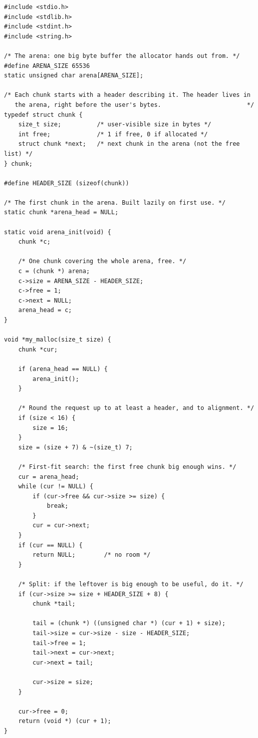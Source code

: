 \begin{lstlisting}[caption={A minimal free-list allocator, on a static arena.}]
#include <stdio.h>
#include <stdlib.h>
#include <stdint.h>
#include <string.h>

/* The arena: one big byte buffer the allocator hands out from. */
#define ARENA_SIZE 65536
static unsigned char arena[ARENA_SIZE];

/* Each chunk starts with a header describing it. The header lives in
   the arena, right before the user's bytes.                        */
typedef struct chunk {
    size_t size;          /* user-visible size in bytes */
    int free;             /* 1 if free, 0 if allocated */
    struct chunk *next;   /* next chunk in the arena (not the free list) */
} chunk;

#define HEADER_SIZE (sizeof(chunk))

/* The first chunk in the arena. Built lazily on first use. */
static chunk *arena_head = NULL;

static void arena_init(void) {
    chunk *c;

    /* One chunk covering the whole arena, free. */
    c = (chunk *) arena;
    c->size = ARENA_SIZE - HEADER_SIZE;
    c->free = 1;
    c->next = NULL;
    arena_head = c;
}

void *my_malloc(size_t size) {
    chunk *cur;

    if (arena_head == NULL) {
        arena_init();
    }

    /* Round the request up to at least a header, and to alignment. */
    if (size < 16) {
        size = 16;
    }
    size = (size + 7) & ~(size_t) 7;

    /* First-fit search: the first free chunk big enough wins. */
    cur = arena_head;
    while (cur != NULL) {
        if (cur->free && cur->size >= size) {
            break;
        }
        cur = cur->next;
    }
    if (cur == NULL) {
        return NULL;        /* no room */
    }

    /* Split: if the leftover is big enough to be useful, do it. */
    if (cur->size >= size + HEADER_SIZE + 8) {
        chunk *tail;

        tail = (chunk *) ((unsigned char *) (cur + 1) + size);
        tail->size = cur->size - size - HEADER_SIZE;
        tail->free = 1;
        tail->next = cur->next;
        cur->next = tail;

        cur->size = size;
    }

    cur->free = 0;
    return (void *) (cur + 1);
}


\end{lstlisting}
